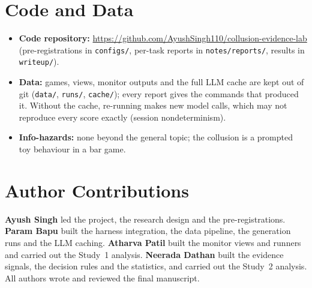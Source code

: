 \documentclass[conference]{IEEEtran}
\begin{document}
\section*{Code and Data}
\begin{itemize}
  \item \textbf{Code repository:} \url{https://github.com/AyushSingh110/collusion-evidence-lab} (pre-registrations in
  \texttt{configs/}, per-task reports in \texttt{notes/reports/}, results in \texttt{writeup/}).
  \item \textbf{Data:} games, views, monitor outputs and the full LLM cache are kept out of git (\texttt{data/},
  \texttt{runs/}, \texttt{cache/}); every report gives the commands that produced it. Without the cache, re-running makes
  new model calls, which may not reproduce every score exactly (session nondeterminism).
  \item \textbf{Info-hazards:} none beyond the general topic; the collusion is a prompted toy behaviour in a bar game.
\end{itemize}

\section*{Author Contributions}
\textbf{Ayush Singh} led the project, the research design and the pre-registrations. \textbf{Param Bapu} built the
harness integration, the data pipeline, the generation runs and the LLM caching. \textbf{Atharva Patil} built the
monitor views and runners and carried out the Study~1 analysis. \textbf{Neerada Dathan} built the evidence signals,
the decision rules and the statistics, and carried out the Study~2 analysis. All authors wrote and reviewed the final
manuscript.
\end{document}
